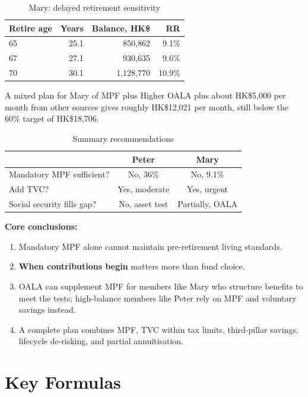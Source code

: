 \documentclass[12pt, letterpaper]{article}
\begin{document}
\begin{table}[H]
  \centering
  \caption{Mary: delayed retirement sensitivity}
  \label{tab:delay}
  \small
  \begin{tabular}{@{}lrrr@{}}
    \toprule
    Retire age & Years & Balance, HK\$ & RR \\
    \midrule
    65 & 25.1 & 850,862 & 9.1\% \\
    67 & 27.1 & 930,635 & 9.6\% \\
    70 & 30.1 & 1,128,770 & 10.9\% \\
    \bottomrule
  \end{tabular}
\end{table}

A mixed plan for Mary of MPF plus Higher OALA plus about HK\$5,000 per month from other sources gives roughly HK\$12,021 per month, still below the 60\% target of HK\$18,706.

\begin{table}[H]
  \centering
  \caption{Summary recommendations}
  \label{tab:conclusion}
  \small
  \begin{tabular}{@{}lcc@{}}
    \toprule
    & Peter & Mary \\
    \midrule
    Mandatory MPF sufficient? & No, 36\% & No, 9.1\% \\
    Add TVC? & Yes, moderate & Yes, urgent \\
    Social security fills gap? & No, asset test & Partially, OALA \\
    \bottomrule
  \end{tabular}
\end{table}

\textbf{Core conclusions:}
\begin{enumerate}
  \item Mandatory MPF alone cannot maintain pre-retirement living standards.
  \item \textbf{When contributions begin} matters more than fund choice.
  \item OALA can supplement MPF for members like Mary who structure benefits to meet the tests; high-balance members like Peter rely on MPF and voluntary savings instead.
  \item A complete plan combines MPF, TVC within tax limits, third-pillar savings, lifecycle de-risking, and partial annuitisation.
\end{enumerate}

\section*{Key Formulas}
\end{document}
